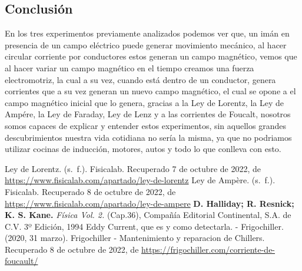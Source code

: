 \documentclass[]{article}
\begin{document}
\begin{multicols*}{2}
\section*{Conclusión}
En los tres experimentos previamente analizados podemos ver que, un imán en presencia de un campo eléctrico puede generar movimiento mecánico, al hacer circular corriente por conductores estos generan un campo magnético, vemos que al hacer variar un campo magnético en el tiempo creamos una fuerza electromotriz, la cual a su vez, cuando está dentro de un conductor, genera corrientes que a su vez generan un nuevo campo magnético,
 el cual se opone a el campo magnético inicial que lo genera, gracias a la Ley de Lorentz, la Ley de Ampére, la Ley de Faraday, Ley de Lenz y a las corrientes de Foucalt, nosotros somos capaces de explicar y entender estos experimentos, sin aquellos grandes descubrimientos nuestra vida cotidiana no sería la misma, ya que no podriamos utilizar cocinas de inducción, motores, autos y todo lo que conlleva con esto.





\begin{thebibliography}{5}
      Ley de Lorentz. (s. f.). Fisicalab. Recuperado 7 de octubre de 2022, 
    de \url{https://www.fisicalab.com/apartado/ley-de-lorentz}
    Ley de Ampère. (s. f.). Fisicalab. Recuperado 8 de octubre de 2022, 
    de \url{https://www.fisicalab.com/apartado/ley-de-ampere}
     \textbf{D. Halliday; R. Resnick; K. S. Kane.} \textit{Física Vol. 2.} (Cap.36), Compañía Editorial Continental, S.A. de C.V. 3º Edición, 1994
     Eddy Current, que es y como detectarla. - Frigochiller. (2020, 31 marzo). Frigochiller - Mantenimiento y reparacion de Chillers. Recuperado 8 de octubre de 2022, 
    de \url{https://frigochiller.com/corriente-de-foucault/}
\end{thebibliography}
\end{multicols*}
\end{document}
